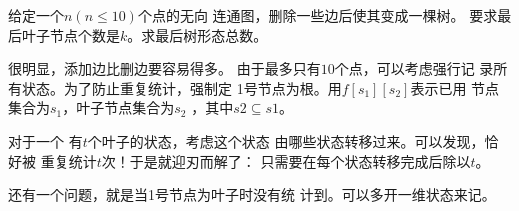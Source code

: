 \begin{prob}
	给定一个$n(n\le 10)$个点的无向
	连通图，删除一些边后使其变成一棵树。
	要求最后叶子节点个数是$k$。求最后树形态总数。
\end{prob}

\begin{sol}
	很明显，添加边比删边要容易得多。
	由于最多只有$10$个点，可以考虑强行记
	录所有状态。为了防止重复统计，强制定
	1号节点为根。用$f[s_1][s_2]$表示已用
	节点集合为$s_1$，叶子节点集合为$s_2$
	，其中$s2 \subseteq s1$。
	\par 对于一个
	有$t$个叶子的状态，考虑这个状态
	由哪些状态转移过来。可以发现，恰好被
	重复统计$t$次！于是就迎刃而解了：
	只需要在每个状态转移完成后除以$t$。\par
	还有一个问题，就是当1号节点为叶子时没有统
	计到。可以多开一维状态来记。
\end{sol}
